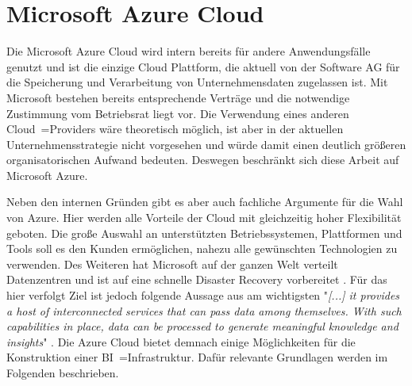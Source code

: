 \section{Microsoft Azure Cloud} \label{sec:grundlagen:bi_in_der_cloud_mit_azure}
Die Microsoft Azure Cloud wird intern bereits für andere Anwendungsfälle genutzt und ist die einzige Cloud Plattform, die aktuell von der Software AG für die Speicherung und Verarbeitung von Unternehmensdaten zugelassen ist. Mit Microsoft bestehen bereits entsprechende Verträge und die notwendige Zustimmung vom Betriebsrat liegt vor. Die Verwendung eines anderen Cloud~=Providers wäre theoretisch möglich, ist aber in der aktuellen Unternehmensstrategie nicht vorgesehen und würde damit einen deutlich größeren organisatorischen Aufwand bedeuten. Deswegen beschränkt sich diese Arbeit auf Microsoft Azure.

Neben den internen Gründen gibt es aber auch fachliche Argumente für die Wahl von Azure. Hier werden alle Vorteile der Cloud mit gleichzeitig hoher Flexibilität geboten. Die große Auswahl an unterstützten Betriebssystemen, Plattformen und Tools soll es den Kunden ermöglichen, nahezu alle gewünschten Technologien zu verwenden. Des Weiteren hat Microsoft auf der ganzen Welt verteilt Datenzentren und ist auf eine schnelle Disaster Recovery vorbereitet \cite{modi_azure_2020}. Für das hier verfolgt Ziel ist jedoch folgende Aussage aus  am wichtigsten "\textit{[...] it provides a host of interconnected services that can pass data among themselves. With such capabilities in place, data can be processed to generate meaningful knowledge and insights}" \cite{modi_azure_2020}. Die Azure Cloud bietet demnach einige Möglichkeiten für die Konstruktion einer BI~=Infrastruktur. Dafür relevante Grundlagen werden im Folgenden beschrieben.

